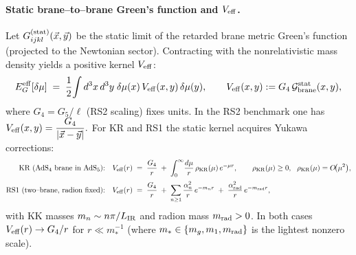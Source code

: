 \documentclass[10pt]{article}
\theoremstyle{definition}
\theoremstyle{plain}
\begin{document}
\paragraph{Static brane--to--brane Green's function and \(V_{\rm eff}\).}\label{par:uom-main-225}
Let \(G^{\rm (stat)}_{ijkl}(\vec x,\vec y)\) be the static limit of the retarded brane metric Green's function (projected to the Newtonian sector). Contracting with the nonrelativistic mass density yields a positive kernel \(V_{\rm eff}\):
\[
E_G^{\rm eff}[\delta\mu]\;=\;\frac12\!\int d^3x\,d^3y\;\delta\mu(x)\,V_{\rm eff}(x,y)\,\delta\mu(y),
\qquad V_{\rm eff}(x,y):=G_4\,\mathcal G_{\rm brane}^{\rm stat}(x,y),
\]
where \(G_4=G_5/\ell\) (RS2 scaling) fixes units. In the RS2 benchmark one has
\(
V_{\rm eff}(x,y)=\dfrac{G_4}{|\vec x-\vec y|}.
\)
For KR and RS1 the static kernel acquires Yukawa corrections:
\begin{align*}
\text{KR (AdS\(_4\) brane in AdS\(_5\)):}\quad
&V_{\rm eff}(r)\;=\;\frac{G_4}{r}\;+\;\int_0^\infty\!\frac{d\mu}{r}\,\rho_{\rm KR}(\mu)\,e^{-\mu r},
\qquad \rho_{\rm KR}(\mu)\ge 0,\ \ \rho_{\rm KR}(\mu)=O\!\big(\mu^2\big),\\[2pt]
\text{RS1 (two--brane, radion fixed):}\quad
&V_{\rm eff}(r)\;=\;\frac{G_4}{r}\;+\;\sum_{n\ge1}\frac{\alpha_n^2}{r}\,e^{-m_n r}
\;+\;\frac{\alpha_{\rm rad}^2}{r}\,e^{-m_{\rm rad} r},
\end{align*}
with KK masses \(m_n\sim n\pi/L_{\rm IR}\) and radion mass \(m_{\rm rad}>0\). In both cases \(V_{\rm eff}(r)\to G_4/r\) for \(r\ll m_\ast^{-1}\) (where \(m_\ast\in\{m_g,m_1,m_{\rm rad}\}\) is the lightest nonzero scale).
\end{document}
